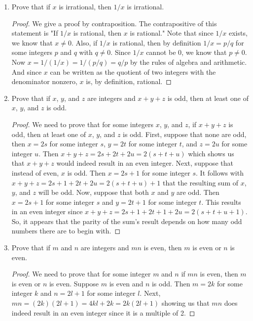\documentclass[11pt]{article}
\begin{document}
\begin{enumerate}[label=\textbf{\arabic*.}]
	\item Prove that if $x$ is irrational, then $1/x$ is irrational.
	
	\begin{proof}
		We give a proof by contraposition. The contrapositive of this statement is "If $1/x$ is rational, then $x$ is rational." Note that since $1/x$ exists, we know that $x \ne 0$. Also, if $1/x$ is rational, then by definition $1/x = p/q$ for some integers $p$ and $q$ with $q \ne 0$. Since $1/x$ cannot be 0, we know that $p \ne 0$. Now $x = 1/(1/x) = 1/(p/q) = q/p$ by the rules of algebra and arithmetic. And since $x$ can be written as the quotient of two integers with the denominator nonzero, $x$ is, by definition, rational.
	\end{proof}

	\item Prove that if $x$, $y$, and $z$ are integers and $x + y + z$ is odd, then at least one of $x$, $y$, and $z$ is odd.
	
	\begin{proof}
		We need to prove that for some integers $x$, $y$, and $z$, if $x + y + z$ is odd, then at least one of $x$, $y$, and $z$ is odd. First, suppose that none are odd, then $x = 2s$ for some integer $s$, $y = 2t$ for some integer $t$, and $z = 2u$ for some integer $u$. Then $x + y + z = 2s + 2t + 2u = 2(s + t + u)$ which shows us that $x + y + z$ would indeed result in an even integer. Next, suppose that instead of even, $x$ is odd. Then $x = 2s + 1$ for some integer $s$. It follows with $x + y + z = 2s + 1 + 2t + 2u = 2(s + t + u) + 1$ that the resulting sum of $x$, $y$, and $z$ will be odd. Now, suppose that both $x$ and $y$ are odd. Then $x = 2s + 1$ for some integer $s$ and $y = 2t + 1$ for some integer $t$. This results in an even integer since $x + y + z = 2s + 1 + 2t + 1 + 2u = 2(s + t + u + 1)$. So, it appears that the parity of the sum's result depends on how many odd numbers there are to begin with.
	\end{proof}

	\item Prove that if $m$ and $n$ are integers and $mn$ is even, then $m$ is even or $n$ is even.
	
	\begin{proof}
		We need to prove that for some integer $m$ and $n$ if $mn$ is even, then $m$ is even or $n$ is even. Suppose $m$ is even and $n$ is odd. Then $m = 2k$ for some integer $k$ and $n = 2l + 1$ for some integer $l$. Next, $mn = (2k)(2l + 1) = 4kl + 2k = 2k(2l + 1)$ showing us that $mn$ does indeed result in an even integer since it is a multiple of 2.
	\end{proof}
\end{enumerate}
\end{document}
